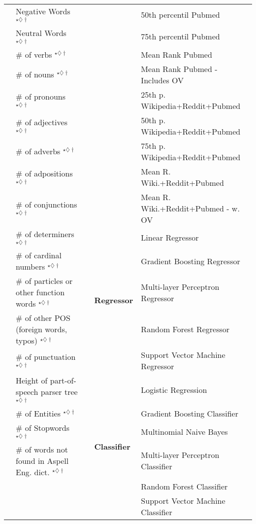 \begin{table}[tb]
{\begin{tabular}{llcll}
 & Negative Words $^{\star\diamondsuit\dagger}$ &  &  & 50th percentil Pubmed\tabularnewline
 & Neutral Words $^{\star\diamondsuit\dagger}$ &  &  & 75th percentil Pubmed\tabularnewline
 & \# of verbs $^{\star\diamondsuit\dagger}$ &  &  & Mean Rank Pubmed\tabularnewline
 & \# of nouns $^{\star\diamondsuit\dagger}$ &  &  &  Mean Rank Pubmed - Includes OV\tabularnewline
 & \# of pronouns $^{\star\diamondsuit\dagger}$ &  &  & 25th p. Wikipedia+Reddit+Pubmed  \tabularnewline
 & \# of adjectives $^{\star\diamondsuit\dagger}$ &  &  & 50th p. Wikipedia+Reddit+Pubmed \tabularnewline
 & \# of adverbs $^{\star\diamondsuit\dagger}$ &  &  & 75th p. Wikipedia+Reddit+Pubmed \tabularnewline
 & \# of adpositions $^{\star\diamondsuit\dagger}$ &  &  & Mean R. Wiki.+Reddit+Pubmed \tabularnewline 
 & \# of conjunctions $^{\star\diamondsuit\dagger}$ & &  & Mean R. Wiki.+Reddit+Pubmed - w. OV \tabularnewline
\cline{4-5} 
 & \# of determiners $^{\star\diamondsuit\dagger}$ & & \multirow{5}{*}{\textbf{Regressor}} & Linear Regressor\tabularnewline  
 & \# of cardinal numbers $^{\star\diamondsuit\dagger}$ &  &  & Gradient Boosting Regressor\tabularnewline
 & \# of particles or other function words $^{\star\diamondsuit\dagger}$ &  &  & Multi-layer Perceptron Regressor\tabularnewline
 & \# of other POS (foreign words, typos) $^{\star\diamondsuit\dagger}$ &  &  & Random Forest Regressor\tabularnewline
 & \# of punctuation $^{\star\diamondsuit\dagger}$ &  &  & Support Vector Machine Regressor\tabularnewline
\cline{4-5} 
 & Height of part-of-speech parser tree $^{\star\diamondsuit\dagger}$ &  &  \multirow{6}{*}{\textbf{Classifier}} & Logistic Regression\tabularnewline
 & \# of Entities $^{\star\diamondsuit\dagger}$ &  &  & Gradient Boosting Classifier\tabularnewline
 & \# of Stopwords $^{\star\diamondsuit\dagger}$ &  &  & Multinomial Naive Bayes\tabularnewline
 & \# of words not found in Aspell Eng. dict. $^{\star\diamondsuit\dagger}$ &  &  & Multi-layer Perceptron Classifier\tabularnewline
 &  &  &  & Random Forest Classifier\tabularnewline
 &  &  &  & Support Vector Machine Classifier\tabularnewline
\cline{1-2} \cline{4-5} 
\end{tabular}
}
\end{table}
